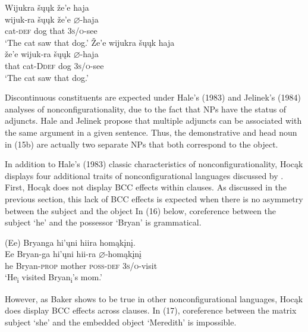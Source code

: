 \documentclass[output=paper]{LSP/langsci}
\begin{document}
\begin{exe}
\ex
\begin{xlist}
\ex  
\glll Wijukra	\v{s}\k{u}\k{u}k	\v{z}e'e	haja \\
wijuk-ra	\v{s}\k{u}\k{u}k	\v{z}e'e	$\varnothing$-haja \\
	cat-\textsc{def} 	dog	that		\textsc{3s/o}-see\\
\trans `The cat saw that dog.'
\ex 
\glll \v{Z}e'e	wijukra	 \v{s}\k{u}\k{u}k	haja \\
\v{z}e'e	wijuk-ra	\v{s}\k{u}\k{u}k	$\varnothing$-haja \\
that cat-D\textsc{def} dog \textsc{3s/o}-see \\
\trans `The cat saw that dog.'
\end{xlist}
\end{exe}

Discontinuous constituents are expected under Hale's (1983) and Jelinek's (1984) analyses of nonconfigurationality, due to the fact that NPs have the status of adjuncts. Hale and Jelinek propose that multiple adjuncts can be associated with the same argument in a given sentence. Thus, the demonstrative and head noun in (15b) are actually two separate NPs that both correspond to the object.

In addition to Hale's (1983) classic characteristics of nonconfigurationality, Hoc\k{a}k displays four additional traits of nonconfigurational languages discussed by \citet{Baker1996}. First, Hoc\k{a}k does not display BCC effects within clauses.  As discussed in the previous section, this lack of BCC effects is expected when there is no asymmetry between the subject and the object In (16) below, coreference between the subject `he' and the possessor `Bryan' is grammatical.

\begin{exe}
\ex	
\glll (Ee) 	Bryanga 			hi'\k{u}ni 	hiira 				hom\k{a}k\k{i}n\k{i}. \\
Ee 		Bryan-ga 		hi'\k{u}ni 	hii-ra 			$\varnothing$-hom\k{a}k\k{i}n\k{i} \\
he 		Bryan-\textsc{prop} mother 	\textsc{poss-def} 	\textsc{3s/o}-visit  \\
\trans `He\textsubscript{i} visited Bryan\textsubscript{i}'s mom.'
\end{exe}
However, as Baker shows to be true in other nonconfigurational languages, Hoc\k{a}k does display BCC effects across clauses. In (17), coreference between the matrix subject `she' and the embedded object `Meredith' is impossible.
\end{document}

